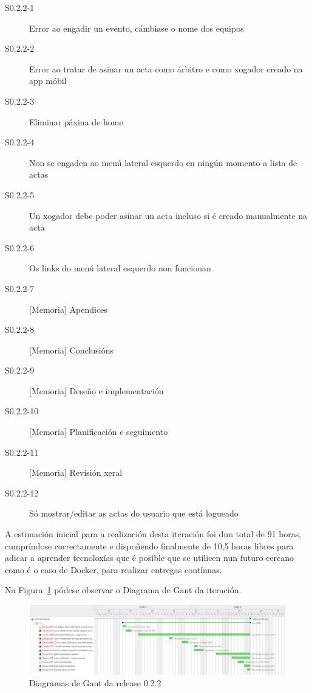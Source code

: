         \begin{description}
        \item [S0.2.2-1] Error ao engadir un evento, cámbiase o nome dos equipos
        \item [S0.2.2-2] Error ao tratar de asinar un acta como árbitro e como 
xogador creado na app móbil
        \item [S0.2.2-3] Eliminar páxina de home
        \item [S0.2.2-4] Non se engaden ao menú lateral esquerdo en ningún 
momento a lista de actas
        \item [S0.2.2-5] Un xogador debe poder asinar un acta incluso si é 
creado manualmente na acta 
        \item [S0.2.2-6] Os links do menú lateral esquerdo non funcionan
        \item [S0.2.2-7] [Memoria] Apendices
        \item [S0.2.2-8] [Memoria] Conclusións
        \item [S0.2.2-9] [Memoria] Deseño e implementación
        \item [S0.2.2-10] [Memoria] Planificación e seguimento
        \item [S0.2.2-11] [Memoria] Revisión xeral
        \item [S0.2.2-12] Só mostrar/editar as actas do usuario que está 
logueado
        \end{description}

        A estimación inicial para a realización desta iteración foi dun total 
de 91 horas, cumpríndose correctamente e dispoñendo finalmente de 10,5 horas 
libres para adicar a aprender tecnoloxías que é posible que se utilicen nun 
futuro cercano como é o caso de Docker, para realizar entregas contínuas.

        Na Figura~\ref{fig:gant22} pódese observar o Diagrama de Gant da 
iteración.

        \begin{figure}[h!]
          \begin{center}
          \includegraphics[width=\textwidth]{./img/gant_diagrams/022.png}
          \caption{Diagramas de Gant da release 0.2.2}
          \label{fig:gant22}
          \end{center}
        \end{figure}

